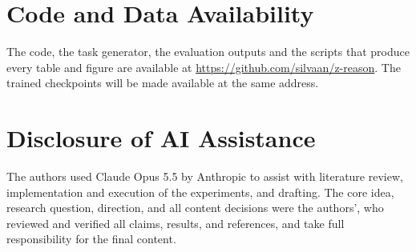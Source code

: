 \documentclass{article}
\begin{document}
\section*{Code and Data Availability}
The code, the task generator, the evaluation outputs and the scripts that produce every table and figure are available at \url{https://github.com/silvaan/z-reason}. The trained checkpoints will be made available at the same address.

\section*{Disclosure of AI Assistance}
The authors used Claude Opus 5.5 by Anthropic to assist with literature review, implementation and execution of the experiments, and drafting. The core idea, research question, direction, and all content decisions were the authors', who reviewed and verified all claims, results, and references, and take full responsibility for the final content.



\end{document}
